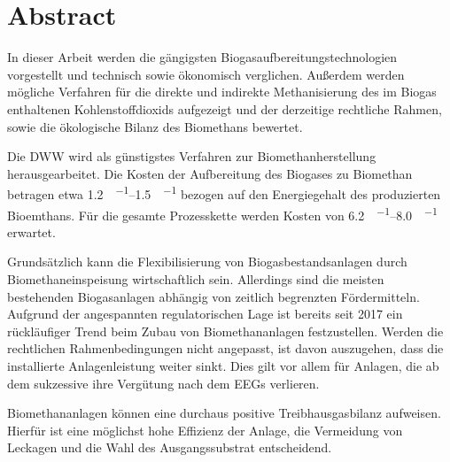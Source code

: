 
\section*{Abstract}

\forceindent In dieser Arbeit werden die gängigsten Biogasaufbereitungstechnologien vorgestellt und technisch sowie ökonomisch verglichen. Außerdem werden mögliche Verfahren für die direkte und indirekte Methanisierung des im Biogas enthaltenen Kohlenstoffdioxids aufgezeigt und der derzeitige rechtliche Rahmen, sowie die ökologische Bilanz des Biomethans bewertet. \smallskip

\forceindent Die \gls{DWW} wird als günstigstes Verfahren zur Biomethanherstellung herausgearbeitet. Die Kosten der Aufbereitung des Biogases zu Biomethan betragen etwa \SIrange{1,2}{1,5}{\ct\per\kwh} bezogen auf den Energiegehalt des produzierten Bioemthans. Für die gesamte Prozesskette werden Kosten von \SIrange{6,2}{8,0}{\ct\per\kwh} erwartet. \smallskip

\forceindent Grundsätzlich kann die Flexibilisierung von Biogasbestandsanlagen durch Biomethaneinspeisung wirtschaftlich sein. Allerdings sind die meisten bestehenden Biogasanlagen abhängig von zeitlich begrenzten Fördermitteln. Aufgrund der angespannten regulatorischen Lage ist bereits seit \SI{2017}{\relax} ein rückläufiger Trend beim Zubau von Biomethananlagen festzustellen. Werden die rechtlichen Rahmenbedingungen nicht angepasst, ist davon auszugehen, dass die installierte Anlagenleistung weiter sinkt. Dies gilt vor allem für Anlagen, die ab dem  sukzessive ihre Vergütung nach dem \glspl{EEG} verlieren. \smallskip

\forceindent Biomethananlagen können eine durchaus positive Treibhausgasbilanz aufweisen. Hierfür ist eine möglichst hohe Effizienz der Anlage, die Vermeidung von Leckagen und die Wahl des Ausgangssubstrat entscheidend.